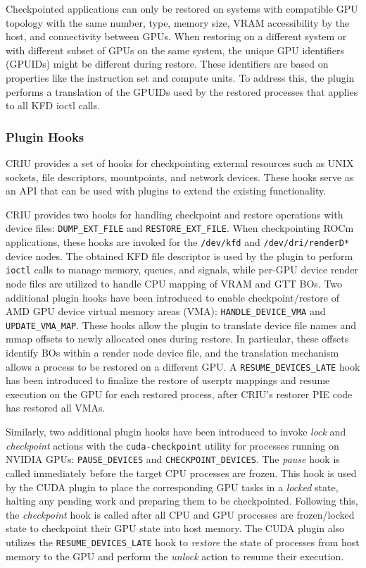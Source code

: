 Checkpointed applications can only be restored on systems with compatible GPU topology with the same number, type, memory size, VRAM accessibility by the host, and connectivity between GPUs.
When restoring on a different system or with different subset of GPUs on the same system, the unique GPU identifiers (GPUIDs) might be different during restore. These identifiers are based on properties like the instruction set and compute units. To address this, the plugin performs a translation of the GPUIDs used by the restored processes that applies to all KFD ioctl calls.


\subsubsection{Plugin Hooks}\label{sec:plugin-hooks}
CRIU provides a set of hooks for checkpointing external resources such as UNIX sockets, file descriptors, mountpoints, and network devices. These hooks serve as an API that can be used with plugins to extend the existing functionality.

 CRIU provides two hooks for handling checkpoint and restore operations with device files: \texttt{DUMP\_EXT\_FILE} and \texttt{RESTORE\_EXT\_FILE}. When checkpointing ROCm applications, these hooks are invoked for the \texttt{/dev/kfd} and \texttt{/dev/dri/renderD*} device nodes. The obtained KFD file descriptor is used by the plugin to perform \texttt{ioctl} calls to manage memory, queues, and signals, while per-GPU device render node files are utilized to handle CPU mapping of VRAM and GTT BOs. Two additional plugin hooks have been introduced to enable checkpoint/restore of AMD GPU device virtual memory areas (VMA): \texttt{HANDLE\_DEVICE\_VMA} and \texttt{UPDATE\_VMA\_MAP}. These hooks allow the plugin to translate device file names and mmap offsets to newly allocated ones during restore. In particular, these offsets identify BOs within a render node device file, and the translation mechanism allows a process to be restored on a different GPU. A \texttt{RESUME\_DEVICES\_LATE} hook has been introduced to finalize the restore of userptr mappings and resume execution on the GPU for each restored process, after CRIU's restorer PIE code has restored all VMAs.

 Similarly, two additional plugin hooks have been introduced to invoke \textit{lock} and \textit{checkpoint} actions with the \texttt{cuda-checkpoint} utility for processes running on NVIDIA GPUs: \texttt{PAUSE\_DEVICES} and \texttt{CHECKPOINT\_DEVICES}. The \textit{pause} hook is called immediately before the target CPU processes are frozen. This hook is used by the CUDA plugin to place the corresponding GPU tasks in a \textit{locked} state, halting any pending work and preparing them to be checkpointed. Following this, the \textit{checkpoint} hook is called after all CPU and GPU processes are frozen/locked state to checkpoint their GPU state into host memory. The CUDA plugin also utilizes the \texttt{RESUME\_DEVICES\_LATE} hook to \textit{restore} the state of processes from host memory to the GPU and perform the \textit{unlock} action to resume their execution.

